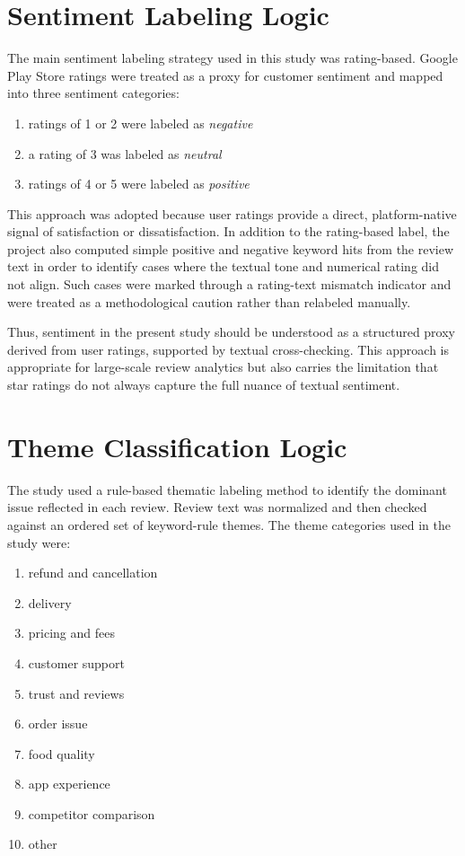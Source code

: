\section{Sentiment Labeling Logic}

The main sentiment labeling strategy used in this study was rating-based. Google Play Store ratings were treated as a proxy for customer sentiment and mapped into three sentiment categories:

\begin{enumerate}[label=\arabic*.]
    \item ratings of 1 or 2 were labeled as \textit{negative}
    \item a rating of 3 was labeled as \textit{neutral}
    \item ratings of 4 or 5 were labeled as \textit{positive}
\end{enumerate}

This approach was adopted because user ratings provide a direct, platform-native signal of satisfaction or dissatisfaction. In addition to the rating-based label, the project also computed simple positive and negative keyword hits from the review text in order to identify cases where the textual tone and numerical rating did not align. Such cases were marked through a rating-text mismatch indicator and were treated as a methodological caution rather than relabeled manually.

Thus, sentiment in the present study should be understood as a structured proxy derived from user ratings, supported by textual cross-checking. This approach is appropriate for large-scale review analytics but also carries the limitation that star ratings do not always capture the full nuance of textual sentiment.

\section{Theme Classification Logic}

The study used a rule-based thematic labeling method to identify the dominant issue reflected in each review. Review text was normalized and then checked against an ordered set of keyword-rule themes. The theme categories used in the study were:

\begin{enumerate}[label=\arabic*.]
    \item refund and cancellation
    \item delivery
    \item pricing and fees
    \item customer support
    \item trust and reviews
    \item order issue
    \item food quality
    \item app experience
    \item competitor comparison
    \item other
\end{enumerate}

